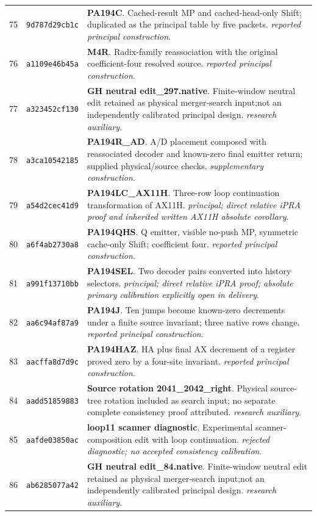 \begin{longtable}{@{}r p{} p{}@{}}
75 & \texttt{9d787d29cb1c} & \textbf{PA194C}. Cached-result MP and cached-head-only Shift; duplicated as the principal table by five packets. \emph{reported principal construction}.\\[3pt]
76 & \texttt{a1109e46b45a} & \textbf{M4R}. Radix-family reassociation with the original coefficient-four resolved source. \emph{reported principal construction}.\\[3pt]
77 & \texttt{a323452cf130} & \textbf{GH neutral edit\_297.native}. Finite-window neutral edit retained as physical merger-search input;not an independently calibrated principal design. \emph{research auxiliary}.\\[3pt]
78 & \texttt{a3ca10542185} & \textbf{PA194R\_AD}. A/D placement composed with reassociated decoder and known-zero final emitter return; supplied physical/source checks. \emph{supplementary construction}.\\[3pt]
79 & \texttt{a54d2cec41d9} & \textbf{PA194LC\_AX11H}. Three-row loop continuation transformation of AX11H. \emph{principal; direct relative iPRA proof and inherited written AX11H absolute corollary}.\\[3pt]
80 & \texttt{a6f4ab2730a8} & \textbf{PA194QHS}. Q emitter, visible no-push MP, symmetric cache-only Shift; coefficient four. \emph{reported principal construction}.\\[3pt]
81 & \texttt{a991f13710bb} & \textbf{PA194SEL}. Two decoder pairs converted into history selectors. \emph{principal; direct relative iPRA proof; absolute primary calibration explicitly open in delivery}.\\[3pt]
82 & \texttt{aa6c94af87a9} & \textbf{PA194J}. Ten jumps become known-zero decrements under a finite source invariant; three native rows change. \emph{reported principal construction}.\\[3pt]
83 & \texttt{aacffa8d7d9c} & \textbf{PA194HAZ}. HA plus final AX decrement of a register proved zero by a four-site invariant. \emph{reported principal construction}.\\[3pt]
84 & \texttt{aadd51859883} & \textbf{Source rotation 2041\_2042\_right}. Physical source-tree rotation included as search input; no separate complete consistency proof attributed. \emph{research auxiliary}.\\[3pt]
85 & \texttt{aafde03850ac} & \textbf{loop11 scanner diagnostic}. Experimental scanner-composition edit with loop continuation. \emph{rejected diagnostic; no accepted consistency calibration}.\\[3pt]
86 & \texttt{ab6285077a42} & \textbf{GH neutral edit\_84.native}. Finite-window neutral edit retained as physical merger-search input;not an independently calibrated principal design. \emph{research auxiliary}.\\[3pt]

\end{longtable}
